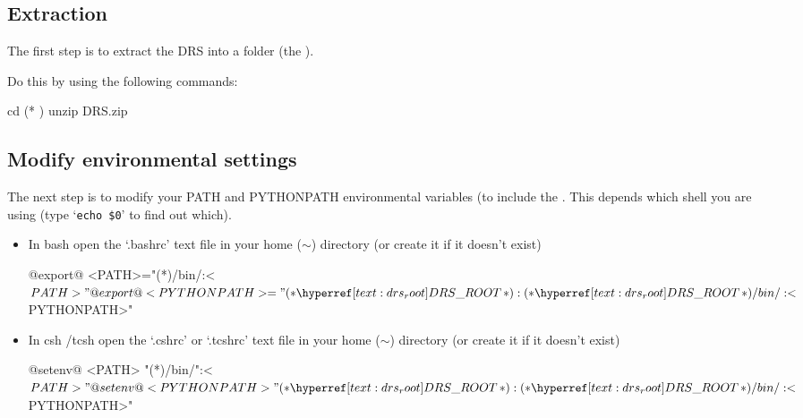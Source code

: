 \subsection{Extraction}
\label{ch:install:installunix:extraction}

The first step is to extract the DRS into a folder (the \InstallDIR).

\noindent Do this by using the following commands:
\begin{cmdbox}
cd (* \InstallDIR *)
unzip DRS.zip
\end{cmdbox}

\subsection{Modify environmental settings}
\label{ch:install:installunix:environ_settings}

The next step is to modify your PATH and PYTHONPATH environmental variables (to include the \InstallDIR. This depends which shell you are using (type `\lstinline[style=bashstyle]{echo $0}' to find out which).

\begin{itemize}
	\item In bash open the `.bashrc' text file in your home ($\sim$) directory (or create it if it doesn't exist)

	\begin{bashbox}[title={e.g. in $\sim$/.bashrc}]
	@export@ <PATH>="(*\InstallDIR*)/bin/:<$PATH>"
	@export@ <PYTHONPATH>="(*\InstallDIR*):(*\InstallDIR*)/bin/:<$PYTHONPATH>"
	\end{bashbox}

	\item In csh /tcsh open the `.cshrc' or `.tcshrc' text file in your home ($\sim$) directory (or create it if it doesn't exist) 

	\begin{cshbox}[title={e.g. in $\sim$/.tcshrc}]
	@setenv@ <PATH> "(*\InstallDIR*)/bin/":<${PATH}>"
	@setenv@ <PYTHONPATH> "(*\InstallDIR*):(*\InstallDIR*)/bin/:<${PYTHONPATH}>"
	\end{cshbox}

\end{itemize}


